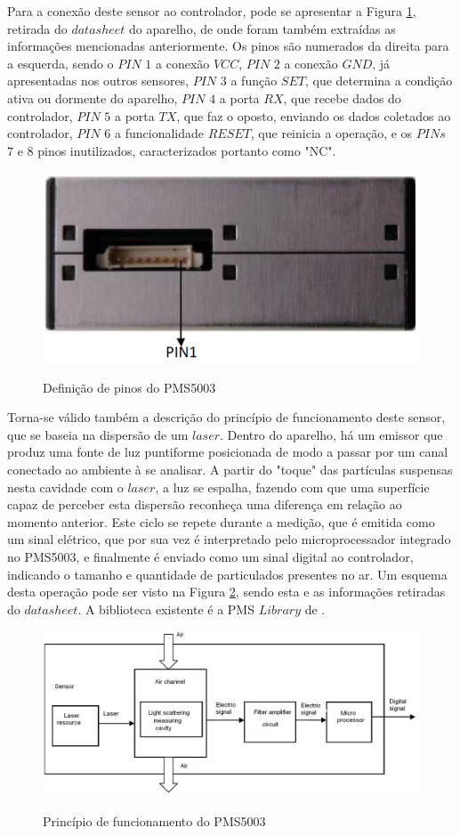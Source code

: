 \documentclass[acronym,symbols]{fei}
\begin{document}
Para a conexão deste sensor ao controlador, pode se apresentar a Figura \ref{fig:PinPart}, retirada do $datasheet$ do aparelho, de onde foram também extraídas as informações mencionadas anteriormente. Os pinos são numerados da direita para a esquerda, sendo o $PIN$ $1$ a conexão $VCC$, $PIN$ $2$ a conexão $GND$, já apresentadas nos outros sensores, $PIN$ $3$ a função $SET$, que determina a condição ativa ou dormente do aparelho, $PIN$ $4$ a porta $RX$, que recebe dados do controlador, $PIN$ $5$ a porta $TX$, que faz o oposto, enviando os dados coletados ao controlador, $PIN$ $6$ a funcionalidade $RESET$, que reinicia a operação, e os $PINs$ $7$ e $8$ pinos inutilizados, caracterizados portanto como "NC". 

\begin{figure}[!htb]
\centering
    \caption{Definição de pinos do PMS5003}
    \includegraphics[width=0.6\linewidth]{Imagens/PinPart.png}
    \label{fig:PinPart}
\end{figure}

Torna-se válido também a descrição do princípio de funcionamento deste sensor, que se baseia na dispersão de um $laser$. Dentro do aparelho, há um emissor que produz uma fonte de luz puntiforme posicionada de modo a passar por um canal conectado ao ambiente à se analisar. A partir do "toque" das partículas suspensas nesta cavidade com o $laser$, a luz se espalha, fazendo com que uma superfície capaz de perceber esta dispersão reconheça uma diferença em relação ao momento anterior. Este ciclo se repete durante a medição, que é emitida como um sinal elétrico, que por sua vez é interpretado pelo microprocessador integrado no PMS5003, e finalmente é enviado como um sinal digital ao controlador, indicando o tamanho e quantidade de particulados presentes no ar. Um esquema desta operação pode ser visto na Figura \ref{fig:FuncPart}, sendo esta e as informações retiradas do $datasheet$. A biblioteca existente é a PMS $Library$ de \textcite{ArduinoPMS}.

\begin{figure}[!htb]
\centering
    \caption{Princípio de funcionamento do PMS5003}
    \includegraphics[width=0.8\linewidth]{Imagens/FuncPart.png}
    \label{fig:FuncPart}
\end{figure}
\end{document}
